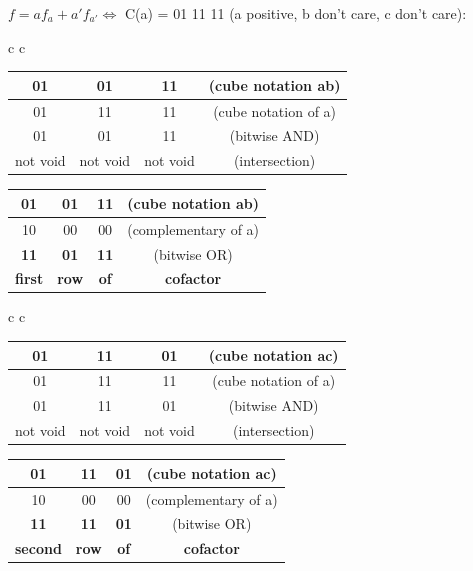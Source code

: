 $f = af_{a} + a'f_{a'} \Leftrightarrow$ C(a) = 01 11 11 (a positive, b don't care, c don't care):\\

\begin{center}
	\begin{tabular}{c  c}
		\begin{tabular}{c | c | c c}
			01 & 01 & 11 & (cube notation ab) \\ \hline
			01 & 11 & 11 & (cube notation of a)\\ \hline 
			01 & 01 & 11 & (bitwise AND) \\ \hline
			not void & not void & not void & (intersection)
		\end{tabular}
		\quad
		\quad
		\quad
		\begin{tabular}{c  c  c c}
			01 & 01 & 11 & (cube notation ab) \\ \hline
			10 & 00 & 00 & (complementary of a)\\ \hline 
			\textbf{11} & \textbf{01} & \textbf{11} & (bitwise OR) \\ \hline
			\textbf{first} & \textbf{row} & \textbf{of} & \textbf{cofactor} \\
		\end{tabular}
	\end{tabular}
\end{center}

\begin{center}
	\begin{tabular}{c  c}
		\begin{tabular}{c | c | c c}
			01 & 11 & 01 & (cube notation ac) \\ \hline
			01 & 11 & 11 & (cube notation of a)\\ \hline 
			01 & 11 & 01 & (bitwise AND) \\ \hline
			not void & not void & not void & (intersection)
		\end{tabular}
		\quad
		\quad
		\quad
		\begin{tabular}{c  c  c c}
			01 & 11 & 01 & (cube notation ac) \\ \hline
			10 & 00 & 00 & (complementary of a)\\ \hline 
			\textbf{11} & \textbf{11} & \textbf{01} & (bitwise OR) \\ \hline
			\textbf{second} & \textbf{row} & \textbf{of} & \textbf{cofactor} \\
		\end{tabular}
	\end{tabular}
\end{center}

